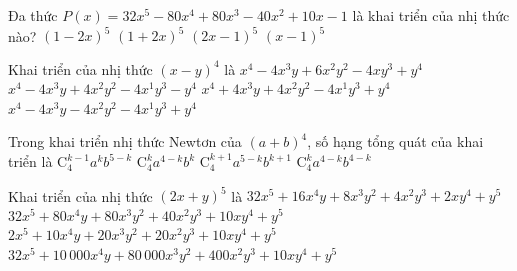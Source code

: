 

\begin{ex}%
	Đa thức $P(x)=32 x^5-80 x^4+80 x^3-40 x^2+10 x-1$  là khai triển của nhị thức nào?
	 \choice
		{$(1-2  x)^5$}
		{$(1+2 x)^5$} 
		{\True $(2  x-1)^5$}
		 {$(x-1)^5$}
\end{ex}

\begin{ex}%
	Khai triển của nhị  thức $(x-y)^4$ là
	\choice 
		{\True $x^4-4 x^3 y+6 x^2 y^2-4 x  y^3+y^4$}
		{$x^4-4 x^3 y+4 x^2 y^2-4 x^1  y^3-y^4$}
		{$x^4+4 x^3 y+4  x^2 y^2-4 x^1 y^3+y^4$}
		{$x^4-4 x^3 y-4  x^2 y^2-4 x^1 y^3+y^4$}
\end{ex}

\begin{ex}%
	Trong khai triển nhị thức Newtơn của $(a+b)^4$, số hạng tổng quát  của khai triển là
	\choice 
		 {$\mathrm{C}_4^{k-1}a^kb^{5-k}$}
		{\True $\mathrm{C}_4^ka^{4-k}b^k$} 
		 {$\mathrm{C}_4^{k+1}a^{5-k}b^{k+1}$}
		{$\mathrm{C}_4^ka^{4-k}b^{4-k}$} 
\end{ex}

\begin{ex}%
	Khai triển của nhị  thức $(2 x+y)^5$ là
	 \choice
		{$32 x^5+16 x^4 y+8 x^3 y^2+4 x^2 y^3+2  x y^4+y^5$}
		{\True $32  x^5+80 x^4 y+80 x^3 y^2+40 x^2 y^3+10 x y^4+y^5$}
		 {$2 x^5+10 x^4 y+20 x^3 y^2+20 x^2 y^3+10 x y^4+y^5$}
		{$32  x^5+10\,000 x^4 y+80\,000 x^3 y^2+400 x^2 y^3+10 x y^4+y^5$}
\end{ex}

